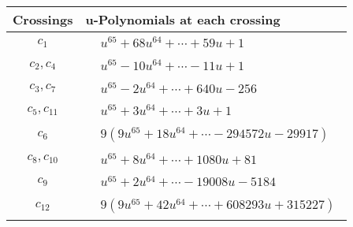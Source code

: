 \documentclass[1p]{elsarticle_modified}
\theoremstyle{definition}
\begin{document}
\begin{tabular}{m{50pt}|m{274pt}}
Crossings & \hspace{64pt}u-Polynomials at each crossing \\
\hline $$\begin{aligned}c_{1}\end{aligned}$$&$\begin{aligned}
&u^{65}+68 u^{64}+\cdots+59 u+1
\end{aligned}$\\
\hline $$\begin{aligned}c_{2},c_{4}\end{aligned}$$&$\begin{aligned}
&u^{65}-10 u^{64}+\cdots-11 u+1
\end{aligned}$\\
\hline $$\begin{aligned}c_{3},c_{7}\end{aligned}$$&$\begin{aligned}
&u^{65}-2 u^{64}+\cdots+640 u-256
\end{aligned}$\\
\hline $$\begin{aligned}c_{5},c_{11}\end{aligned}$$&$\begin{aligned}
&u^{65}+3 u^{64}+\cdots+3 u+1
\end{aligned}$\\
\hline $$\begin{aligned}c_{6}\end{aligned}$$&$\begin{aligned}
&9(9 u^{65}+18 u^{64}+\cdots-294572 u-29917)
\end{aligned}$\\
\hline $$\begin{aligned}c_{8},c_{10}\end{aligned}$$&$\begin{aligned}
&u^{65}+8 u^{64}+\cdots+1080 u+81
\end{aligned}$\\
\hline $$\begin{aligned}c_{9}\end{aligned}$$&$\begin{aligned}
&u^{65}+2 u^{64}+\cdots-19008 u-5184
\end{aligned}$\\
\hline $$\begin{aligned}c_{12}\end{aligned}$$&$\begin{aligned}
&9(9 u^{65}+42 u^{64}+\cdots+608293 u+315227)
\end{aligned}$\\
\hline
\end{tabular}\\~\\
\end{document}
